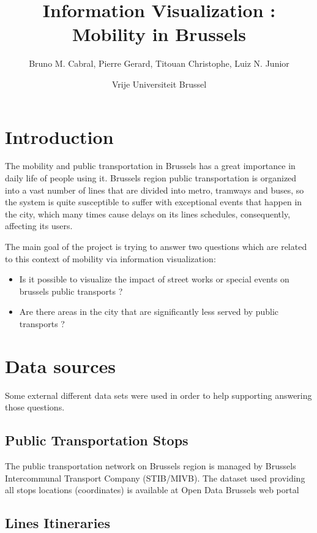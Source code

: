 \documentclass[12pt]{article}%
\begin{document}
\title{Information Visualization : Mobility in Brussels}
\author{Bruno M. Cabral, Pierre Gerard, Titouan Christophe, Luiz N. Junior}
\date{Vrije Universiteit Brussel}
\maketitle


\section{Introduction}
The mobility and public transportation in Brussels has a great importance in daily life of people using it.  Brussels region public transportation is organized into a vast number of lines that are divided into metro, tramways and buses, so the system is quite susceptible to suffer with exceptional events that happen in the city, which many times cause delays on its lines schedules, consequently, affecting its users.

The main goal of the project is trying to answer two questions which are related to this context of mobility via information visualization:

\begin{itemize}
	\item Is it possible to visualize the impact of street works or special events on brussels public transports ?
	\item Are there areas in the city that are significantly less served by public transports ?
\end{itemize}


\section{Data sources}
Some external different data sets were used in order to help supporting answering those questions. 

\subsection{Public Transportation Stops}

The public transportation network on Brussels region is managed by Brussels Intercommunal Transport Company (STIB/MIVB). The dataset used providing all stops locations (coordinates) is available at Open Data Brussels web portal %

\subsection{Lines Itineraries}
\end{document}
